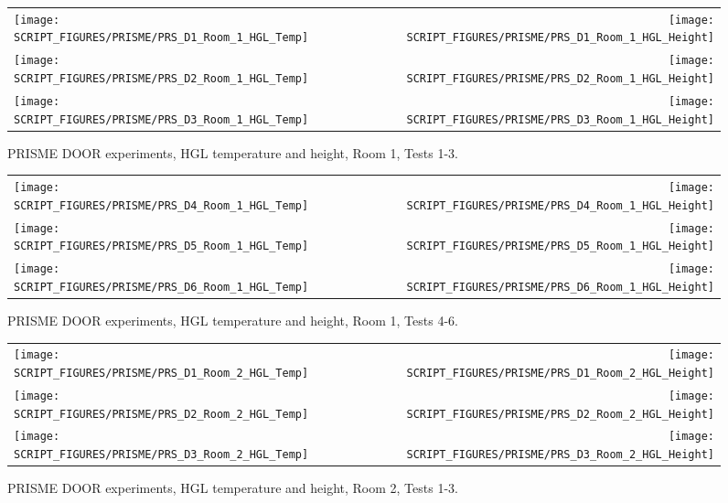 \begin{figure}[!ht]
\begin{tabular*}{\textwidth}{l@{\extracolsep{\fill}}r}
\texttt{[image: SCRIPT\_FIGURES/PRISME/PRS\_D1\_Room\_1\_HGL\_Temp]} &
\texttt{[image: SCRIPT\_FIGURES/PRISME/PRS\_D1\_Room\_1\_HGL\_Height]} \\
\texttt{[image: SCRIPT\_FIGURES/PRISME/PRS\_D2\_Room\_1\_HGL\_Temp]} &
\texttt{[image: SCRIPT\_FIGURES/PRISME/PRS\_D2\_Room\_1\_HGL\_Height]} \\
\texttt{[image: SCRIPT\_FIGURES/PRISME/PRS\_D3\_Room\_1\_HGL\_Temp]} &
\texttt{[image: SCRIPT\_FIGURES/PRISME/PRS\_D3\_Room\_1\_HGL\_Height]}
\end{tabular*}
\caption[PRISME DOOR experiments, HGL temperature and height, Room 1, Tests 1-3]
{PRISME DOOR experiments, HGL temperature and height, Room 1, Tests 1-3.}
\label{PRISME_HGL_1}
\end{figure}

\newpage

\begin{figure}[p]
\begin{tabular*}{\textwidth}{l@{\extracolsep{\fill}}r}
\texttt{[image: SCRIPT\_FIGURES/PRISME/PRS\_D4\_Room\_1\_HGL\_Temp]} &
\texttt{[image: SCRIPT\_FIGURES/PRISME/PRS\_D4\_Room\_1\_HGL\_Height]} \\
\texttt{[image: SCRIPT\_FIGURES/PRISME/PRS\_D5\_Room\_1\_HGL\_Temp]} &
\texttt{[image: SCRIPT\_FIGURES/PRISME/PRS\_D5\_Room\_1\_HGL\_Height]} \\
\texttt{[image: SCRIPT\_FIGURES/PRISME/PRS\_D6\_Room\_1\_HGL\_Temp]} &
\texttt{[image: SCRIPT\_FIGURES/PRISME/PRS\_D6\_Room\_1\_HGL\_Height]}
\end{tabular*}
\caption[PRISME DOOR experiments, HGL temperature and height, Room 1, Tests 4-6]
{PRISME DOOR experiments, HGL temperature and height, Room 1, Tests 4-6.}
\label{PRISME_HGL_2}
\end{figure}

\begin{figure}[p]
\begin{tabular*}{\textwidth}{l@{\extracolsep{\fill}}r}
\texttt{[image: SCRIPT\_FIGURES/PRISME/PRS\_D1\_Room\_2\_HGL\_Temp]} &
\texttt{[image: SCRIPT\_FIGURES/PRISME/PRS\_D1\_Room\_2\_HGL\_Height]} \\
\texttt{[image: SCRIPT\_FIGURES/PRISME/PRS\_D2\_Room\_2\_HGL\_Temp]} &
\texttt{[image: SCRIPT\_FIGURES/PRISME/PRS\_D2\_Room\_2\_HGL\_Height]} \\
\texttt{[image: SCRIPT\_FIGURES/PRISME/PRS\_D3\_Room\_2\_HGL\_Temp]} &
\texttt{[image: SCRIPT\_FIGURES/PRISME/PRS\_D3\_Room\_2\_HGL\_Height]}
\end{tabular*}
\caption[PRISME DOOR experiments, HGL temperature and height, Room 2, Tests 1-3]
{PRISME DOOR experiments, HGL temperature and height, Room 2, Tests 1-3.}
\label{PRISME_HGL_3}
\end{figure}

